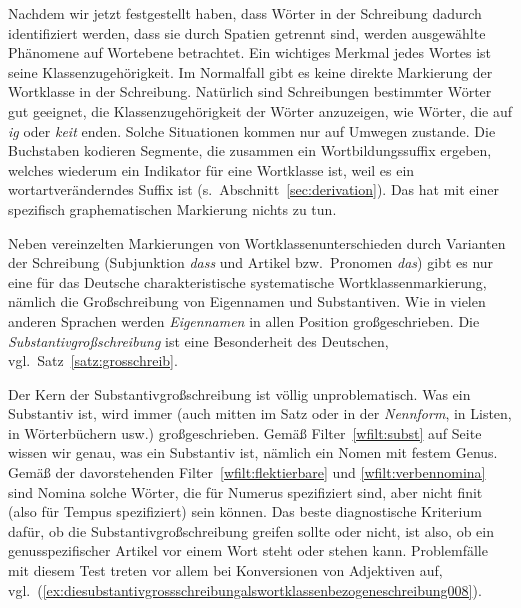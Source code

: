 
Nachdem wir jetzt festgestellt haben, dass Wörter in der Schreibung dadurch identifiziert werden, dass sie durch Spatien getrennt sind, werden ausgewählte Phänomene auf Wortebene betrachtet.
Ein wichtiges Merkmal jedes Wortes ist seine Klassenzugehörigkeit.
Im Normalfall gibt es keine direkte Markierung der Wortklasse in der Schreibung.
Natürlich sind Schreibungen bestimmter Wörter gut geeignet, die Klassenzugehörigkeit der Wörter anzuzeigen, wie \zB Wörter, die auf \textit{ig} oder \textit{keit} enden.
Solche Situationen kommen nur auf Umwegen zustande.
Die Buchstaben kodieren Segmente, die zusammen ein Wortbildungssuffix ergeben, welches wiederum ein Indikator für eine Wortklasse ist, weil es ein wortartveränderndes Suffix ist (s.\ Abschnitt~\ref{sec:derivation}).
Das hat mit einer spezifisch graphematischen Markierung nichts zu tun.

Neben vereinzelten Markierungen von Wortklassenunterschieden durch Varianten der Schreibung (Subjunktion \textit{dass} und Artikel bzw.\ Pronomen \textit{das}) gibt es nur eine für das Deutsche charakteristische systematische Wortklassenmarkierung, nämlich die Großschreibung von Eigennamen und Substantiven.
Wie in vielen anderen Sprachen werden \textit{Eigennamen} in allen Position großgeschrieben.
Die \textit{Substantivgroßschreibung} ist eine Besonderheit des Deutschen, vgl.\ Satz~\ref{satz:grosschreib}.



Der Kern der Substantivgroßschreibung ist völlig unproblematisch.
Was ein Substantiv ist, wird immer (auch mitten im Satz oder in der \textit{Nennform}, in Listen, in Wörterbüchern usw.) großgeschrieben.
Gemäß Filter~\ref{wfilt:subst} auf Seite~\pageref{wfilt:subst} wissen wir genau, was ein Substantiv ist, nämlich ein Nomen mit festem Genus.
Gemäß der davorstehenden Filter~\ref{wfilt:flektierbare} und \ref{wfilt:verbennomina} sind Nomina solche Wörter, die für Numerus spezifiziert sind, aber nicht finit (also für Tempus spezifiziert) sein können.
Das beste diagnostische Kriterium dafür, ob die Substantivgroßschreibung greifen sollte oder nicht, ist also, ob ein genusspezifischer Artikel vor einem Wort steht oder stehen kann.
Problemfälle mit diesem Test treten vor allem bei Konversionen von Adjektiven auf, vgl.\ (\ref{ex:diesubstantivgrossschreibungalswortklassenbezogeneschreibung008}).

